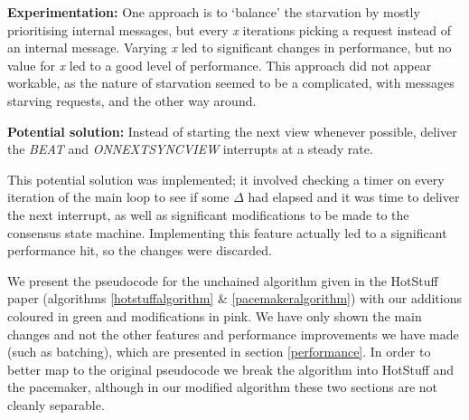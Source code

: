 \textbf{Experimentation: } One approach is to `balance' the starvation by mostly prioritising internal messages, but every \textit{x} iterations picking a request instead of an internal message. Varying \textit{x} led to significant changes in performance, but no value for \textit{x} led to a good level of performance. This approach did not appear workable, as the nature of starvation seemed to be a complicated, with messages starving requests, and the other way around.

\textbf{Potential solution: } Instead of starting the next view whenever possible, deliver the \textit{BEAT} and \textit{ON{\large N}EXT{\large S}YNC{\large V}IEW} interrupts at a steady rate.

This potential solution was implemented; it involved checking a timer on every iteration of the main loop to see if some $\Delta$ had elapsed and it was time to deliver the next interrupt, as well as significant modifications to be made to the consensus state machine. Implementing this feature actually led to a significant performance hit, so the changes were discarded.




We present the pseudocode for the unchained algorithm given in the HotStuff paper (algorithms \ref{hotstuffalgorithm} \& \ref{pacemakeralgorithm}) with our additions coloured in green and modifications in pink. We have only shown the main changes and not the other features and performance improvements we have made (such as batching), which are presented in section \ref{performance}. In order to better map to the original pseudocode we break the algorithm into HotStuff and the pacemaker, although in our modified algorithm these two sections are not cleanly separable.

